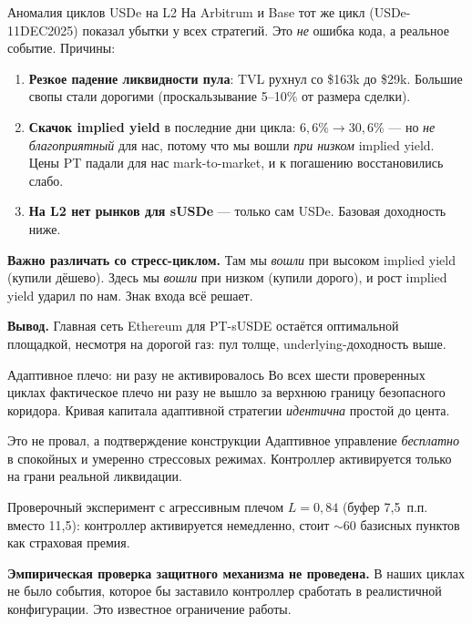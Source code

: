 \documentclass[11pt,aspectratio=169]{beamer}
\begin{document}
\begin{frame}{Аномалия циклов USDe на L2}
  \footnotesize
  На Arbitrum и Base тот же цикл (USDe-11DEC2025) показал убытки
  у всех стратегий. Это \emph{не} ошибка кода, а реальное событие.
  Причины:

  \vspace{0.5em}
  \normalsize
  \begin{enumerate}\itemsep0.2em
    \item \textbf{Резкое падение ликвидности пула}: TVL рухнул со \$163k
          до \$29k. Большие свопы стали дорогими (проскальзывание 5--10\%
          от размера сделки).
    \item \textbf{Скачок implied yield} в последние дни цикла: $6{,}6\% \to 30{,}6\%$
          --- но \emph{не благоприятный} для нас, потому что мы вошли
          \emph{при низком} implied yield. Цены PT падали для нас
          mark-to-market, и к погашению восстановились слабо.
    \item \textbf{На L2 нет рынков для sUSDe} --- только сам USDe.
          Базовая доходность ниже.
  \end{enumerate}

  \vspace{0.5em}
  \footnotesize
  \textbf{Важно различать со стресс-циклом.} Там мы \emph{вошли}
  при высоком implied yield (купили дёшево). Здесь мы \emph{вошли}
  при низком (купили дорого), и рост implied yield ударил по нам.
  Знак входа всё решает.

  \vspace{0.4em}
  \normalsize
  \textbf{Вывод.} Главная сеть Ethereum для PT-sUSDE остаётся
  оптимальной площадкой, несмотря на дорогой газ: пул толще,
  underlying-доходность выше.
\end{frame}

\begin{frame}{Адаптивное плечо: ни разу не активировалось}
  Во всех шести проверенных циклах фактическое плечо ни разу не
  вышло за верхнюю границу безопасного коридора. Кривая капитала
  адаптивной стратегии \emph{идентична} простой до цента.

  \vspace{0.5em}
  \begin{block}{Это не провал, а подтверждение конструкции}
    \large
    Адаптивное управление \emph{бесплатно} в спокойных и умеренно
    стрессовых режимах. Контроллер активируется только на грани
    реальной ликвидации.
  \end{block}

  \vspace{0.5em}
  Проверочный эксперимент с агрессивным плечом $L = 0{,}84$
  (буфер 7{,}5~п.п. вместо 11{,}5): контроллер активируется немедленно,
  стоит $\sim$60 базисных пунктов как страховая премия.

  \vspace{0.4em}
  \textbf{Эмпирическая проверка защитного механизма не проведена.}
  В наших циклах не было события, которое бы заставило контроллер
  сработать в реалистичной конфигурации. Это известное ограничение
  работы.
\end{frame}
\end{document}
